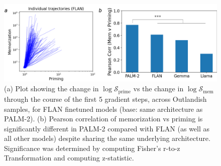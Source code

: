 \documentclass[11pt, a4paper, logo, copyright]{googledeepmind}
\theoremstyle{plain}
\theoremstyle{definition}
\theoremstyle{remark}
\begin{document}
\begin{figure}[h]
\vspace{0mm}
    \centering \includegraphics[scale=.2,clip]{figures/Reviewer_FLAN.png}
    \vspace{-1mm}
    \caption{(a) Plot showing the change in $\log \mathcal{S}_\text{prime}$ vs the change in $\log \mathcal{S}_\text{mem}$ through the course of the first 5 gradient steps, across Outlandish samples, for FLAN finetuned models (base: same architecture as PALM-2). (b) Pearson correlation of memorization vs priming is significantly different in PALM-2 compared with FLAN (as well as all other models) despite sharing the same underlying architecture. Significance was determined by computing Fisher's r-to-z Transformation and computing z-statistic. } \label{fig:Reviewer_FLAN}
  \vspace{-0mm}
\end{figure}
\end{document}
